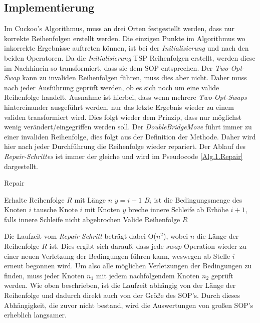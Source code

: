 \documentclass[conference]{IEEEtran}
\begin{document}
    \subsection{Implementierung} \label{Implementierung Repair}
      Im Cuckoo's Algorithmus, muss an drei Orten festgestellt werden, dass nur korrekte Reihenfolgen erstellt werden. 
      Die einzigen Punkte im Algorithmus wo inkorrekte Ergebnisse auftreten können, ist bei der \textit{Initialisierung} 
      und nach den beiden Operatoren. Da die \textit{Initialisierung} TSP Reihenfolgen erstellt, werden diese im Nachhinein so 
      transformiert, dass sie dem SOP entsprechen. Der \textit{Two-Opt-Swap} kann zu invaliden Reihenfolgen führen, muss dies aber 
      nicht. Daher muss nach jeder Ausführung geprüft werden, ob es sich noch um eine valide Reihenfolge handelt. 
      Ausnahme ist hierbei, dass wenn mehrere \textit{Two-Opt-Swaps} hintereinander ausgeführt werden, nur das letzte Ergebnis 
      wieder zu einem validen transformiert wird. Dies folgt wieder dem Prinzip, dass nur möglichst wenig verändert/eingegriffen 
      werden soll. Der \textit{DoubleBridgeMove} führt immer zu einer invaliden Reihenfolge, dies folgt aus der Definition der Methode. 
      Daher wird hier nach jeder Durchführung die Reihenfolge wieder repariert. Der Ablauf des \textit{Repair-Schrittes} ist immer 
      der gleiche und wird im Pseudocode \ref{Alg.1.Repair} dargestellt.

      
      \begin{algorithm}
        \caption{Repair}\label{Alg.1.Repair}
        \begin{algorithmic}[1]
        \State Erhalte Reihenfolge $R$ mit Länge $n$
          \State $y = i+1$
          \State $B_i$ ist die Bedingungsmenge des Knoten $i$
              \State tausche Knote $i$ mit Knoten $y$
              \State breche innere Schleife ab
            \EndIf
          \EndWhile
          \State Erhöhe $i+1$, falls innere Schleife nicht abgebrochen
        \EndWhile
        \State Valide Reihenfolge $R$
        
        \end{algorithmic}
        \end{algorithm}

      Die Laufzeit vom \textit{Repair-Schritt} beträgt dabei O($n^2$), wobei $n$ die Länge der Reihenfolge $R$ ist. Dies ergibt sich darauß, dass
      jede $swap$-Operation wieder zu einer neuen Verletzung der Bedingungen führen kann, weswegen ab Stelle $i$ erneut begonnen wird.
      Um also alle möglichen Verletzungen der Bedingungen zu finden, muss jeder Knoten $n_1$ mit jedem nachfolgendem Knoten $n_2$ geprüft werden. 
      Wie oben beschrieben, ist die Laufzeit abhängig von der Länge der Reihenfolge und dadurch direkt auch von der Größe des SOP's. 
      Durch dieses Abhängigkeit, die zuvor nicht bestand, wird die Auswertungen von großen SOP's erheblich langsamer. 
\end{document}
